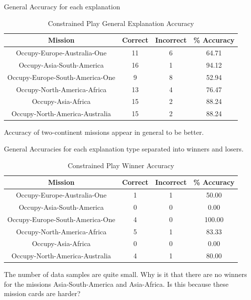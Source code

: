 \documentclass[parskip]{cs4rep}
\begin{document}
General Accuracy for each explanation

\begin{table}[ht]
\centering
\begin{tabular}{|c|c|c|c|}
\hline 
\textbf{Mission} & \textbf{Correct} & \textbf{Incorrect} & \textbf{\% Accuracy} \\ 
\hline 
Occupy-Europe-Australia-One & 11 & 6 & 64.71 \\  
\hline 
Occupy-Asia-South-America & 16 & 1 & 94.12 \\ 
\hline
Occupy-Europe-South-America-One & 9 & 8 & 52.94 \\
\hline
Occupy-North-America-Africa & 13 & 4 & 76.47 \\
\hline
Occupy-Asia-Africa & 15 & 2 & 88.24 \\
\hline
Occupy-North-America-Australia & 15 & 2 & 88.24 \\
\hline
\end{tabular}
\caption{Constrained Play General Explanation Accuracy}
\label{table:continent-bonus}
\end{table}

Accuracy of two-continent missions appear in general to be better.

General Accuracies for each explanation type separated into winners and losers.

\begin{table}[ht]
\centering
\begin{tabular}{|c|c|c|c|}
\hline 
\textbf{Mission} & \textbf{Correct} & \textbf{Incorrect} & \textbf{\% Accuracy} \\ 
\hline 
Occupy-Europe-Australia-One & 1 & 1 & 50.00 \\  
\hline 
Occupy-Asia-South-America & 0 & 0 & 0.00 \\ 
\hline
Occupy-Europe-South-America-One & 4 & 0 & 100.00 \\
\hline
Occupy-North-America-Africa & 5 & 1 & 83.33 \\
\hline
Occupy-Asia-Africa & 0 & 0 & 0.00 \\
\hline
Occupy-North-America-Australia & 4 & 1 & 80.00 \\
\hline
\end{tabular}
\caption{Constrained Play Winner Accuracy}
\label{table:continent-bonus}
\end{table}
		
The number of data samples are quite small.	Why is it that there are no winners for the missions Asia-South-America and Asia-Africa. Is this because these mission cards are harder?
\end{document}
